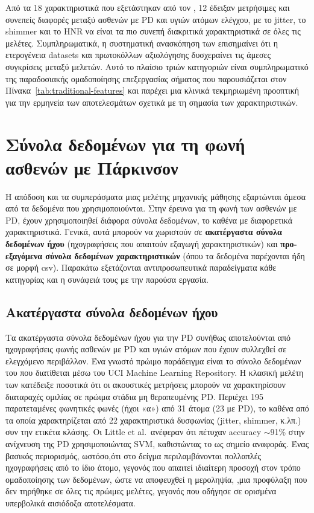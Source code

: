 Από τα 18 χαρακτηριστικά που εξετάστηκαν από τον \citet{wright2025vocal}, 12 έδειξαν μετρήσιμες και συνεπείς διαφορές μεταξύ ασθενών με PD και υγιών ατόμων ελέγχου, με το \gls{jitter}, το \gls{shimmer} και το HNR να είναι τα πιο συνεπή διακριτικά χαρακτηριστικά σε όλες τις μελέτες. Συμπληρωματικά, η συστηματική ανασκόπηση των \citet{ngo2022systematicreview} επισημαίνει ότι η ετερογένεια datasets και πρωτοκόλλων αξιολόγησης δυσχεραίνει τις άμεσες συγκρίσεις μεταξύ μελετών. Αυτό το πλαίσιο τριών κατηγοριών είναι συμπληρωματικό της παραδοσιακής ομαδοποίησης επεξεργασίας σήματος που παρουσιάζεται στον Πίνακα~\ref{tab:traditional-features} και παρέχει μια κλινικά τεκμηριωμένη προοπτική για την ερμηνεία των αποτελεσμάτων σχετικά με τη σημασία των χαρακτηριστικών.

\section{Σύνολα δεδομένων για τη φωνή ασθενών με Πάρκινσον}

Η απόδοση και τα συμπεράσματα μιας μελέτης μηχανικής μάθησης εξαρτώνται άμεσα από τα δεδομένα που χρησιμοποιούνται. 
Στην έρευνα για τη φωνή των ασθενών με PD, έχουν χρησιμοποιηθεί διάφορα σύνολα δεδομένων, το καθένα με διαφορετικά χαρακτηριστικά. 
Γενικά, αυτά μπορούν να χωριστούν σε \textbf{ακατέργαστα σύνολα δεδομένων ήχου} (ηχογραφήσεις που απαιτούν εξαγωγή χαρακτηριστικών) και \textbf{προ-εξαγόμενα σύνολα δεδομένων χαρακτηριστικών} (όπου τα δεδομένα παρέχονται ήδη σε μορφή csv). 
Παρακάτω εξετάζονται αντιπροσωπευτικά παραδείγματα κάθε κατηγορίας και η συνάφειά τους με την παρούσα εργασία.

\subsection{Ακατέργαστα σύνολα δεδομένων ήχου}

Τα ακατέργαστα σύνολα δεδομένων ήχου για την PD συνήθως αποτελούνται από ηχογραφήσεις φωνής ασθενών με PD και υγιών ατόμων που έχουν συλλεχθεί σε ελεγχόμενο περιβάλλον. 
Ένα γνωστό πρώιμο παράδειγμα είναι το σύνολο δεδομένων του \citet{little2007nonlinear} που διατίθεται μέσω του UCI Machine Learning Repository. 
Η κλασική μελέτη των \citet{rusz2011quantitative} κατέδειξε ποσοτικά ότι οι ακουστικές μετρήσεις μπορούν να χαρακτηρίσουν διαταραχές ομιλίας σε πρώιμα στάδια μη θεραπευμένης PD. 
Περιέχει 195 παρατεταμένες φωνητικές φωνές (ήχοι «α») από 31 άτομα (23 με PD), το καθένα από τα οποία χαρακτηρίζεται από 22 χαρακτηριστικά δυσφωνίας (\gls{jitter}, \gls{shimmer}, κ.λπ.) συν την ετικέτα κλάσης. 
Οι Little et al.\ ανέφεραν ότι πέτυχαν accuracy $\sim$91\% στην ανίχνευση της PD χρησιμοποιώντας SVM, καθιστώντας το ως σημείο αναφοράς.
Ένας βασικός περιορισμός, ωστόσο,ότι στο δείγμα περιλαμβάνονται πολλαπλές ηχογραφήσεις από το ίδιο άτομο, γεγονός που απαιτεί ιδιαίτερη προσοχή στον τρόπο ομαδοποίησης των δεδομένων, ώστε να αποφευχθεί η μεροληψία,
,μια προφύλαξη που δεν τηρήθηκε σε όλες τις πρώιμες μελέτες, γεγονός που οδήγησε σε ορισμένα υπερβολικά αισιόδοξα αποτελέσματα.

